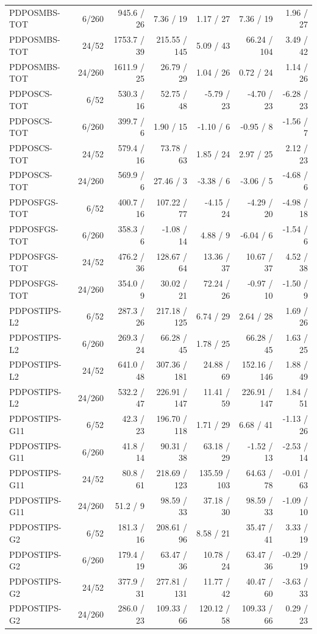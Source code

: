 \documentclass[11pt,a4paper]{article}
\begin{document}
\begin{longtable}{p{26mm}rrrrrr}
PDPOSMBS-TOT & 6/260 & 945.6 / 26 & 7.36 / 19 & 1.17 / 27 & 7.36 / 19 & 1.96 / 27 \\
PDPOSMBS-TOT & 24/52 & 1753.7 / 39 & 215.55 / 145 & 5.09 / 43 & 66.24 / 104 & 3.49 / 42 \\
PDPOSMBS-TOT & 24/260 & 1611.9 / 25 & 26.79 / 29 & 1.04 / 26 & 0.72 / 24 & 1.14 / 26 \\
PDPOSCS-TOT & 6/52 & 530.3 / 16 & 52.75 / 48 & -5.79 / 23 & -4.70 / 23 & -6.28 / 23 \\
PDPOSCS-TOT & 6/260 & 399.7 / 6 & 1.90 / 15 & -1.10 / 6 & -0.95 / 8 & -1.56 / 7 \\
PDPOSCS-TOT & 24/52 & 579.4 / 16 & 73.78 / 63 & 1.85 / 24 & 2.97 / 25 & 2.12 / 23 \\
PDPOSCS-TOT & 24/260 & 569.9 / 6 & 27.46 / 3 & -3.38 / 6 & -3.06 / 5 & -4.68 / 6 \\
PDPOSFGS-TOT & 6/52 & 400.7 / 16 & 107.22 / 77 & -4.15 / 24 & -4.29 / 20 & -4.98 / 18 \\
PDPOSFGS-TOT & 6/260 & 358.3 / 6 & -1.08 / 14 & 4.88 / 9 & -6.04 / 6 & -1.54 / 6 \\
PDPOSFGS-TOT & 24/52 & 476.2 / 36 & 128.67 / 64 & 13.36 / 37 & 10.67 / 37 & 4.52 / 38 \\
PDPOSFGS-TOT & 24/260 & 354.0 / 9 & 30.02 / 21 & 72.24 / 26 & -0.97 / 10 & -1.50 / 9 \\
PDPOSTIPS-L2 & 6/52 & 287.3 / 26 & 217.18 / 125 & 6.74 / 29 & 2.64 / 28 & 1.69 / 26 \\
PDPOSTIPS-L2 & 6/260 & 269.3 / 24 & 66.28 / 45 & 1.78 / 25 & 66.28 / 45 & 1.63 / 25 \\
PDPOSTIPS-L2 & 24/52 & 641.0 / 48 & 307.36 / 181 & 24.88 / 69 & 152.16 / 146 & 1.88 / 49 \\
PDPOSTIPS-L2 & 24/260 & 532.2 / 47 & 226.91 / 147 & 11.41 / 59 & 226.91 / 147 & 1.84 / 51 \\
PDPOSTIPS-G11 & 6/52 & 42.3 / 23 & 196.70 / 118 & 1.71 / 29 & 6.68 / 41 & -1.13 / 26 \\
PDPOSTIPS-G11 & 6/260 & 41.8 / 14 & 90.31 / 38 & 63.18 / 29 & -1.52 / 13 & -2.53 / 14 \\
PDPOSTIPS-G11 & 24/52 & 80.8 / 61 & 218.69 / 123 & 135.59 / 103 & 64.63 / 78 & -0.01 / 63 \\
PDPOSTIPS-G11 & 24/260 & 51.2 / 9 & 98.59 / 33 & 37.18 / 30 & 98.59 / 33 & -1.09 / 10 \\
PDPOSTIPS-G2 & 6/52 & 181.3 / 16 & 208.61 / 96 & 8.58 / 21 & 35.47 / 41 & 3.33 / 19 \\
PDPOSTIPS-G2 & 6/260 & 179.4 / 19 & 63.47 / 36 & 10.78 / 24 & 63.47 / 36 & -0.29 / 19 \\
PDPOSTIPS-G2 & 24/52 & 377.9 / 31 & 277.81 / 131 & 11.77 / 42 & 40.47 / 60 & -3.63 / 33 \\
PDPOSTIPS-G2 & 24/260 & 286.0 / 23 & 109.33 / 66 & 120.12 / 58 & 109.33 / 66 & 0.29 / 23 \\
\end{longtable}
\endgroup
\end{document}

